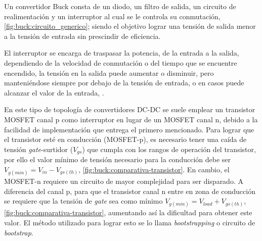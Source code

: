 Un convertidor Buck consta de un diodo, un filtro de salida, un circuito de realimentación y un interruptor al cual se le controla su conmutación, \cref{fig:buck:circuito_generico}; siendo el objetivo lograr una tensión de salida menor a la tensión de entrada sin prescindir de eficiencia. 

El interruptor se encarga de traspasar la potencia, de la entrada a la salida, dependiendo de la velocidad de conmutación o del tiempo que se encuentre encendido, la tensión en la salida puede aumentar o disminuir, pero manteniéndose siempre por debajo de la tensión de entrada, o en casos puede alcanzar el valor de la entrada, \parencite{RASHID}.

En este tipo de topología de convertidores DC-DC se suele emplear un transistor MOSFET canal p como interruptor en lugar de un MOSFET canal n, debido a la facilidad de implementación que entrega el primero mencionado. Para lograr que el transistor esté en conducción (MOSFET-p), es necesario tener una caída de tensión \textit{gate}-surtidor ($V_{gs}$) que cumpla con los rangos de operación del transistor, por ello el valor mínimo de tensión necesario para la conducción debe ser $V_{g(min)} = V_{in} - V_{gs(th)}$\protect\footnotemark, \cref{fig:buck:comparativa-transistor}. En cambio, el MOSFET-n requiere un circuito de mayor complejidad para ser disparado. A diferencia del canal p, para que el transistor canal n entre en zona de conducción se requiere que la tensión de \textit{gate} sea como mínimo $V_{g(min)} = V_{load} + V_{gs(th)}$\protect\footnotemark, \cref{fig:buck:comparativa-transistor}, aumentando así la dificultad para obtener este valor. El método utilizado para lograr esto se lo llama \textit{bootstrapping} o circuito de \textit{bootstrap}.

